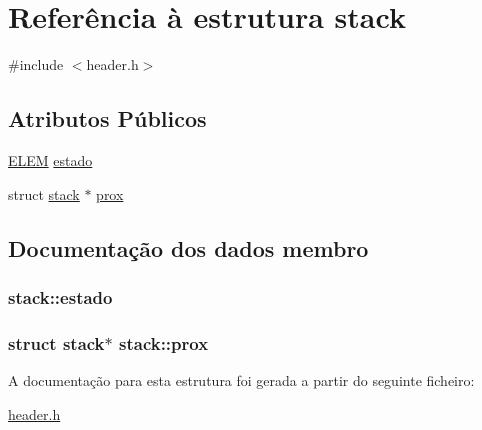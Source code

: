 \hypertarget{structstack}{\section{Referência à estrutura stack}
\label{structstack}
}


{\ttfamily \#include $<$header.\-h$>$}

\subsection*{Atributos Públicos}
\begin{DoxyCompactItemize}
\item 
\hyperlink{header_8h_a04f4375bfb1c91e8c3ea010d913021ff}{E\-L\-E\-M} \hyperlink{structstack_a92a899dc86ffc25076cc16a0ed61ca8b}{estado}
\item 
struct \hyperlink{structstack}{stack} $\ast$ \hyperlink{structstack_ad00ef6fe84e682c6ac405873709da502}{prox}
\end{DoxyCompactItemize}


\subsection{Documentação dos dados membro}
\hypertarget{structstack_a92a899dc86ffc25076cc16a0ed61ca8b}{
\subsubsection[{estado}]{ stack\-::estado}}\label{structstack_a92a899dc86ffc25076cc16a0ed61ca8b}
\hypertarget{structstack_ad00ef6fe84e682c6ac405873709da502}{
\subsubsection[{prox}]{\setlength{\rightskip}{0pt plus 5cm}struct {\bf stack}$\ast$ stack\-::prox}}\label{structstack_ad00ef6fe84e682c6ac405873709da502}


A documentação para esta estrutura foi gerada a partir do seguinte ficheiro\-:\begin{DoxyCompactItemize}
\item 
\hyperlink{header_8h}{header.\-h}\end{DoxyCompactItemize}
